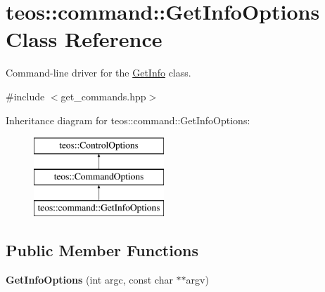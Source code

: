 \hypertarget{classteos_1_1command_1_1_get_info_options}{}\section{teos\+:\+:command\+:\+:Get\+Info\+Options Class Reference}
\label{classteos_1_1command_1_1_get_info_options}


Command-\/line driver for the \mbox{\hyperlink{classteos_1_1command_1_1_get_info}{Get\+Info}} class.  




{\ttfamily \#include $<$get\+\_\+commands.\+hpp$>$}

Inheritance diagram for teos\+:\+:command\+:\+:Get\+Info\+Options\+:\begin{figure}[H]
\begin{center}
\leavevmode
\includegraphics[height=3.000000cm]{classteos_1_1command_1_1_get_info_options}
\end{center}
\end{figure}
\subsection*{Public Member Functions}
\begin{DoxyCompactItemize}
\item 
\mbox{\label{classteos_1_1command_1_1_get_info_options_a4d4b80ca0552b6dc743103af36f5746a}} 
{\bfseries Get\+Info\+Options} (int argc, const char $\ast$$\ast$argv)
\end{DoxyCompactItemize}

